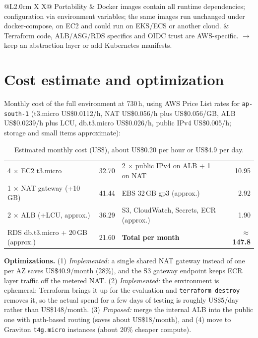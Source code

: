 \documentclass[10pt,a4paper]{article}
\begin{document}
\begin{table}[ht]
\begin{tabularx}{\textwidth}{@{}L{2.0cm} X X@{}}
Portability & Docker images contain all runtime dependencies; configuration via environment variables; the same images run unchanged under docker-compose, on EC2 and could run on EKS/ECS or another cloud. & Terraform code, ALB/ASG/RDS specifics and OIDC trust are AWS-specific. $\to$ keep an abstraction layer or add Kubernetes manifests.\\
\bottomrule
\end{tabularx}
\caption{Mapping of design decisions to NFRs, with honest limitations.}
\end{table}

\section{Cost estimate and optimization}
Monthly cost of the full environment at 730\,h, using AWS Price List rates for \texttt{ap-south-1}
(t3.micro US\$0.0112/h, NAT US\$0.056/h plus US\$0.056/GB, ALB US\$0.0239/h plus LCU, db.t3.micro US\$0.026/h,
public IPv4 US\$0.005/h; storage and small items approximate):

\begin{table}[ht]
\centering\small
\begin{tabular}{@{}lr@{\qquad}lr@{}}
\toprule
4 $\times$ EC2 t3.micro & 32.70 & 2 $\times$ public IPv4 on ALB + 1 on NAT & 10.95\\
1 $\times$ NAT gateway (+10\,GB) & 41.44 & EBS 32\,GB gp3 (approx.) & 2.92\\
2 $\times$ ALB (+LCU, approx.) & 36.29 & S3, CloudWatch, Secrets, ECR (approx.) & 1.90\\
RDS db.t3.micro + 20\,GB (approx.) & 21.60 & \textbf{Total per month} & \textbf{$\approx$ 147.8}\\
\bottomrule
\end{tabular}
\caption{Estimated monthly cost (US\$), about US\$0.20 per hour or US\$4.9 per day.}
\end{table}
\textbf{Optimizations.} (1) \emph{Implemented:} a single shared NAT gateway instead of one per AZ saves US\$40.9/month (28\%),
and the S3 gateway endpoint keeps ECR layer traffic off the metered NAT. (2) \emph{Implemented:} the environment is ephemeral:
Terraform brings it up for the evaluation and \texttt{terraform destroy} removes it, so the actual spend for a few days of testing
is roughly US\$5/day rather than US\$148/month. (3) \emph{Proposed:} merge the internal ALB into the public one with path-based
routing (saves about US\$18/month), and (4) move to Graviton \texttt{t4g.micro} instances (about 20\% cheaper compute).
\end{document}
